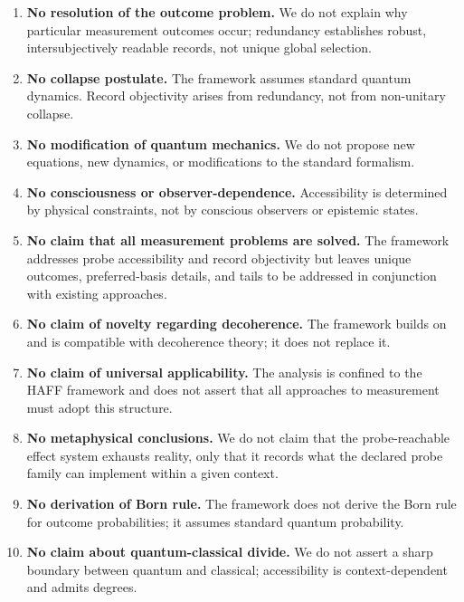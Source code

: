 \documentclass[12pt,a4paper]{article}
\begin{document}
\begin{enumerate}
    \item \textbf{No resolution of the outcome problem.} We do not explain why particular measurement outcomes occur; redundancy establishes robust, intersubjectively readable records, not unique global selection.
    
    \item \textbf{No collapse postulate.} The framework assumes standard quantum dynamics. Record objectivity arises from redundancy, not from non-unitary collapse.
    
    \item \textbf{No modification of quantum mechanics.} We do not propose new equations, new dynamics, or modifications to the standard formalism.
    
    \item \textbf{No consciousness or observer-dependence.} Accessibility is determined by physical constraints, not by conscious observers or epistemic states.
    
    \item \textbf{No claim that all measurement problems are solved.} The framework addresses probe accessibility and record objectivity but leaves unique outcomes, preferred-basis details, and tails to be addressed in conjunction with existing approaches.
    
    \item \textbf{No claim of novelty regarding decoherence.} The framework builds on and is compatible with decoherence theory; it does not replace it.
    
    \item \textbf{No claim of universal applicability.} The analysis is confined to the HAFF framework and does not assert that all approaches to measurement must adopt this structure.
    
    \item \textbf{No metaphysical conclusions.} We do not claim that the probe-reachable effect system exhausts reality, only that it records what the declared probe family can implement within a given context.
    
    \item \textbf{No derivation of Born rule.} The framework does not derive the Born rule for outcome probabilities; it assumes standard quantum probability.
    
    \item \textbf{No claim about quantum-classical divide.} We do not assert a sharp boundary between quantum and classical; accessibility is context-dependent and admits degrees.
    

\end{enumerate}
\end{document}
